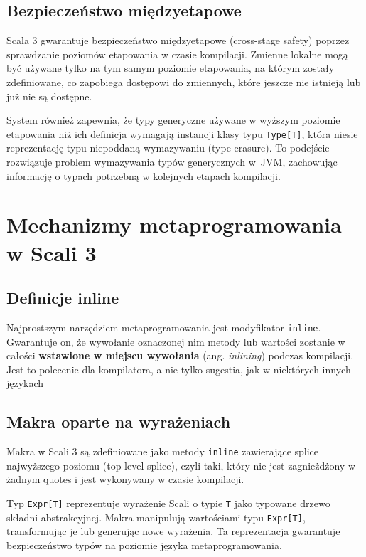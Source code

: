 \subsection{Bezpieczeństwo międzyetapowe}\label{subsec:bezpieczenstwo-miedzyetapowe}
Scala 3 gwarantuje bezpieczeństwo międzyetapowe (cross-stage safety) poprzez sprawdzanie poziomów etapowania w czasie kompilacji\cite{stucki2020thesis,stucki2021multistage}.
Zmienne lokalne mogą być używane tylko na tym samym poziomie etapowania, na którym zostały zdefiniowane, co zapobiega dostępowi do zmiennych, które jeszcze nie istnieją lub już nie są dostępne\cite{stucki2020thesis}.

System również zapewnia, że typy generyczne używane w wyższym poziomie etapowania niż ich definicja wymagają instancji klasy typu \verb|Type[T]|, która niesie reprezentację typu niepoddaną wymazywaniu (type erasure)\cite{stucki2020thesis}.
To podejście rozwiązuje problem wymazywania typów generycznych w~JVM, zachowując informację o typach potrzebną w kolejnych etapach kompilacji.


\section{Mechanizmy metaprogramowania w Scali 3}\label{sec:mechanizmy-metaprogramowania-w-scali-3}

\subsection{Definicje inline}\label{subsec:definicje-inline}
Najprostszym narzędziem metaprogramowania jest modyfikator \verb|inline|.
Gwarantuje on, że wywołanie oznaczonej nim metody lub wartości zostanie w całości \textbf{wstawione w miejscu wywołania} (ang. \textit{inlining}) podczas kompilacji. Jest to polecenie dla kompilatora, a nie tylko sugestia, jak w niektórych innych językach

\subsection{Makra oparte na wyrażeniach}\label{subsec:makra-oparte-na-wyrazeniach}
Makra w Scali 3 są zdefiniowane jako metody \verb|inline| zawierające splice najwyższego poziomu (top-level splice)\cite{scala3-reference-macros,scala3-guides-macros}, czyli taki, który nie jest zagnieżdżony w żadnym quotes i jest wykonywany w czasie kompilacji\cite{scala3-staging,scala3-reference-macros}.

Typ \texttt{Expr[T]} reprezentuje wyrażenie Scali o typie \texttt{T} jako typowane drzewo składni abstrakcyjnej\cite{scala3-reflection,scala3-guides-macros}.
Makra manipulują wartościami typu \texttt{Expr[T]}, transformując je lub generując nowe wyrażenia\cite{scala3-guides-macros}.
Ta reprezentacja gwarantuje bezpieczeństwo typów na poziomie języka metaprogramowania\cite{scala3-reflection}.


